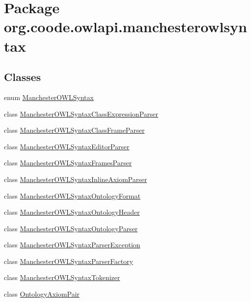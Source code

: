 \hypertarget{namespaceorg_1_1coode_1_1owlapi_1_1manchesterowlsyntax}{\section{Package org.\-coode.\-owlapi.\-manchesterowlsyntax}
\label{namespaceorg_1_1coode_1_1owlapi_1_1manchesterowlsyntax}
}
\subsection*{Classes}
\begin{DoxyCompactItemize}
\item 
enum \hyperlink{enumorg_1_1coode_1_1owlapi_1_1manchesterowlsyntax_1_1_manchester_o_w_l_syntax}{Manchester\-O\-W\-L\-Syntax}
\item 
class \hyperlink{classorg_1_1coode_1_1owlapi_1_1manchesterowlsyntax_1_1_manchester_o_w_l_syntax_class_expression_parser}{Manchester\-O\-W\-L\-Syntax\-Class\-Expression\-Parser}
\item 
class \hyperlink{classorg_1_1coode_1_1owlapi_1_1manchesterowlsyntax_1_1_manchester_o_w_l_syntax_class_frame_parser}{Manchester\-O\-W\-L\-Syntax\-Class\-Frame\-Parser}
\item 
class \hyperlink{classorg_1_1coode_1_1owlapi_1_1manchesterowlsyntax_1_1_manchester_o_w_l_syntax_editor_parser}{Manchester\-O\-W\-L\-Syntax\-Editor\-Parser}
\item 
class \hyperlink{classorg_1_1coode_1_1owlapi_1_1manchesterowlsyntax_1_1_manchester_o_w_l_syntax_frames_parser}{Manchester\-O\-W\-L\-Syntax\-Frames\-Parser}
\item 
class \hyperlink{classorg_1_1coode_1_1owlapi_1_1manchesterowlsyntax_1_1_manchester_o_w_l_syntax_inline_axiom_parser}{Manchester\-O\-W\-L\-Syntax\-Inline\-Axiom\-Parser}
\item 
class \hyperlink{classorg_1_1coode_1_1owlapi_1_1manchesterowlsyntax_1_1_manchester_o_w_l_syntax_ontology_format}{Manchester\-O\-W\-L\-Syntax\-Ontology\-Format}
\item 
class \hyperlink{classorg_1_1coode_1_1owlapi_1_1manchesterowlsyntax_1_1_manchester_o_w_l_syntax_ontology_header}{Manchester\-O\-W\-L\-Syntax\-Ontology\-Header}
\item 
class \hyperlink{classorg_1_1coode_1_1owlapi_1_1manchesterowlsyntax_1_1_manchester_o_w_l_syntax_ontology_parser}{Manchester\-O\-W\-L\-Syntax\-Ontology\-Parser}
\item 
class \hyperlink{classorg_1_1coode_1_1owlapi_1_1manchesterowlsyntax_1_1_manchester_o_w_l_syntax_parser_exception}{Manchester\-O\-W\-L\-Syntax\-Parser\-Exception}
\item 
class \hyperlink{classorg_1_1coode_1_1owlapi_1_1manchesterowlsyntax_1_1_manchester_o_w_l_syntax_parser_factory}{Manchester\-O\-W\-L\-Syntax\-Parser\-Factory}
\item 
class \hyperlink{classorg_1_1coode_1_1owlapi_1_1manchesterowlsyntax_1_1_manchester_o_w_l_syntax_tokenizer}{Manchester\-O\-W\-L\-Syntax\-Tokenizer}
\item 
class \hyperlink{classorg_1_1coode_1_1owlapi_1_1manchesterowlsyntax_1_1_ontology_axiom_pair}{Ontology\-Axiom\-Pair}
\end{DoxyCompactItemize}
